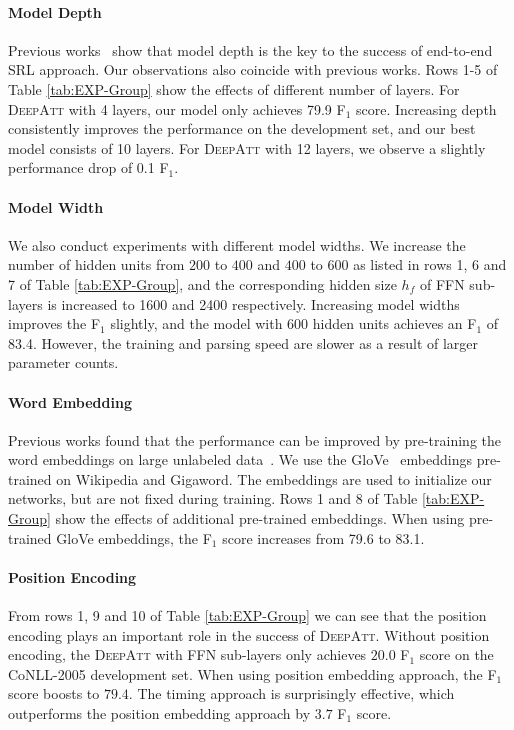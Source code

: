 \documentclass[letterpaper]{article} \usepackage{aaai18}  \usepackage{times}  \usepackage{helvet}  \usepackage{courier}  \usepackage{url}  \usepackage{graphicx}  \frenchspacing  \setlength{\pdfpagewidth}{8.5in}  \setlength{\pdfpageheight}{11in}  \usepackage{latexsym}
\begin{document}
\paragraph{Model Depth}
Previous works~\cite{zhou2015end,he2017deep} show that model depth is the key to the success of end-to-end SRL approach. Our observations also coincide with previous works. Rows 1-5 of Table \ref{tab:EXP-Group} show the effects of different number of layers. For \textsc{DeepAtt} with 4 layers, our model only achieves 79.9 F$_1$ score. Increasing depth consistently improves the performance on the development set, and our best model consists of 10 layers. For \textsc{DeepAtt} with 12 layers, we observe a slightly performance drop of 0.1 F$_1$.

\paragraph{Model Width} We also conduct experiments with different model widths. We increase the number of hidden units from $200$ to $400$ and $400$ to $600$ as listed in rows 1, 6 and 7 of Table \ref{tab:EXP-Group}, and the corresponding hidden size $h_f$ of FFN sub-layers is increased to 1600 and 2400 respectively. Increasing model widths improves the F$_1$ slightly, and the model with 600 hidden units achieves an F$_1$ of 83.4. However, the training and parsing speed are slower as a result of larger parameter counts.

\paragraph{Word Embedding}
Previous works found that the performance can be improved by pre-training the word embeddings on large unlabeled data~\cite{Collobert-Ronan-JMLR2011,zhou2015end}. We use the GloVe~\cite{pennington2014glove} embeddings pre-trained on Wikipedia and Gigaword. The embeddings are used to initialize our networks, but are not fixed during training. Rows 1 and 8 of Table \ref{tab:EXP-Group} show the effects of additional pre-trained embeddings. When using pre-trained GloVe embeddings, the F$_1$ score increases from 79.6 to 83.1.

\paragraph{Position Encoding}
From rows 1, 9 and 10 of Table \ref{tab:EXP-Group} we can see that the position encoding plays an important role in the success of \textsc{DeepAtt}. Without position encoding, the \textsc{DeepAtt} with FFN sub-layers only achieves $20.0$ F$_1$ score on the CoNLL-2005 development set. When using position embedding approach, the F$_1$ score boosts to $79.4$. The timing approach is surprisingly effective, which outperforms the position embedding approach by $3.7$ F$_1$ score.
\end{document}
